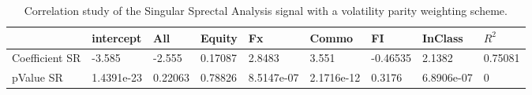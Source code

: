 \begin{table}[H]
\centering
\begin{tabular}{lllllllll}
\hline& intercept & All & Equity & Fx & Commo & FI & InClass & $R^{2}$ \\ 
\hline 
Coefficient SR & -3.585 & -2.555 & 0.17087 & 2.8483 & 3.551 & -0.46535 & 2.1382 & 0.75081 \\ 
pValue SR & 1.4391e-23 & 0.22063 & 0.78826 & 8.5147e-07 & 2.1716e-12 & 0.3176 & 6.8906e-07 & 0 \\ 
\hline
\end{tabular}
\caption{Correlation study of the Singular Sprectal Analysis signal with a volatility parity weighting scheme.}
\label{SSA_CORR}
\end{table}